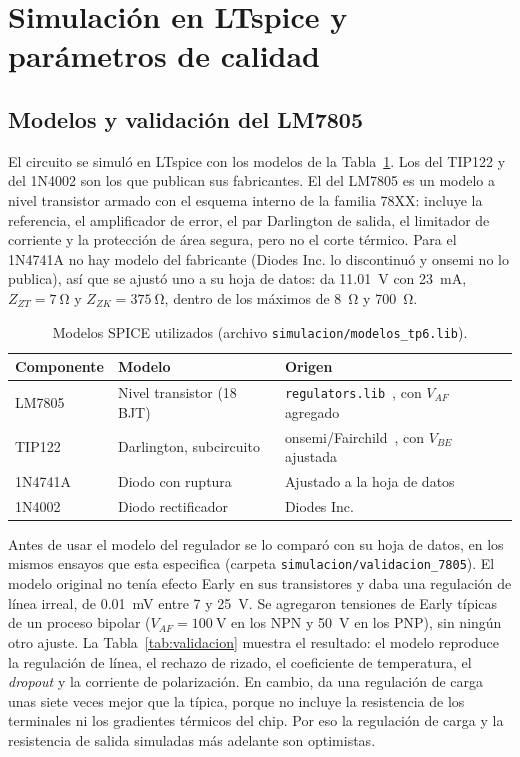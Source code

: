 \section{Simulación en LTspice y parámetros de calidad}
\label{sec:sim}

\subsection{Modelos y validación del LM7805}
El circuito se simuló en LTspice con los modelos de la Tabla~\ref{tab:modelos}. Los del TIP122 y del 1N4002 son los que publican sus fabricantes. El del LM7805 es un modelo a nivel transistor armado con el esquema interno de la familia 78XX: incluye la referencia, el amplificador de error, el par Darlington de salida, el limitador de corriente y la protección de área segura, pero no el corte térmico. Para el 1N4741A no hay modelo del fabricante (Diodes Inc. lo discontinuó y onsemi no lo publica), así que se ajustó uno a su hoja de datos: da \SI{11,01}{\volt} con \SI{23}{\milli\ampere}, $Z_{ZT} = \SI{7}{\ohm}$ y $Z_{ZK} = \SI{375}{\ohm}$, dentro de los máximos de \SI{8}{\ohm} y \SI{700}{\ohm}.

\begin{table}[!htb]
\centering
\caption{Modelos SPICE utilizados (archivo \texttt{simulacion/modelos\_tp6.lib}).}
\label{tab:modelos}
\footnotesize
\begin{tabular}{@{}l>{\raggedright}p{2.6cm}>{\raggedright\arraybackslash}p{3.6cm}@{}}
\toprule
\textbf{Componente} & \textbf{Modelo} & \textbf{Origen} \\
\midrule
LM7805 & Nivel transistor (18 BJT) & \texttt{regulators.lib}~\cite{mod7805}, con $V_{AF}$ agregado \\
TIP122 & Darlington, subcircuito & onsemi/Fairchild~\cite{modtip}, con $V_{BE}$ ajustada \\
1N4741A & Diodo con ruptura & Ajustado a la hoja de datos~\cite{zener} \\
1N4002 & Diodo rectificador & Diodes Inc.~\cite{mod4002} \\
\bottomrule
\end{tabular}
\end{table}

Antes de usar el modelo del regulador se lo comparó con su hoja de datos, en los mismos ensayos que esta especifica (carpeta \texttt{simulacion/validacion\_7805}). El modelo original no tenía efecto Early en sus transistores y daba una regulación de línea irreal, de \SI{0,01}{\milli\volt} entre \SI{7}{} y \SI{25}{\volt}. Se agregaron tensiones de Early típicas de un proceso bipolar ($V_{AF} = \SI{100}{\volt}$ en los NPN y \SI{50}{\volt} en los PNP), sin ningún otro ajuste. La Tabla~\ref{tab:validacion} muestra el resultado: el modelo reproduce la regulación de línea, el rechazo de rizado, el coeficiente de temperatura, el \emph{dropout} y la corriente de polarización. En cambio, da una regulación de carga unas siete veces mejor que la típica, porque no incluye la resistencia de los terminales ni los gradientes térmicos del chip. Por eso la regulación de carga y la resistencia de salida simuladas más adelante son optimistas.

